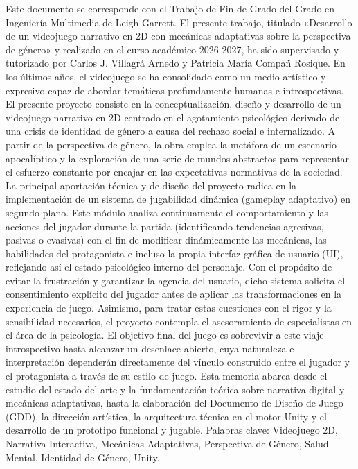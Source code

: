 
Este documento se corresponde con el Trabajo de Fin de Grado del Grado en Ingeniería Multimedia de Leigh Garrett. El presente trabajo, titulado «Desarrollo de un videojuego narrativo en 2D con mecánicas adaptativas sobre la perspectiva de género» y realizado en el curso académico 2026-2027, ha sido supervisado y tutorizado por Carlos J. Villagrá Arnedo y Patricia María Compañ Rosique.
En los últimos años, el videojuego se ha consolidado como un medio artístico y expresivo capaz de abordar temáticas profundamente humanas e introspectivas. El presente proyecto consiste en la conceptualización, diseño y desarrollo de un videojuego narrativo en 2D centrado en el agotamiento psicológico derivado de una crisis de identidad de género a causa del rechazo social e internalizado. A partir de la perspectiva de género, la obra emplea la metáfora de un escenario apocalíptico y la exploración de una serie de mundos abstractos para representar el esfuerzo constante por encajar en las expectativas normativas de la sociedad.
La principal aportación técnica y de diseño del proyecto radica en la implementación de un sistema de jugabilidad dinámica (gameplay adaptativo) en segundo plano. Este módulo analiza continuamente el comportamiento y las acciones del jugador durante la partida (identificando tendencias agresivas, pasivas o evasivas) con el fin de modificar dinámicamente las mecánicas, las habilidades del protagonista e incluso la propia interfaz gráfica de usuario (UI), reflejando así el estado psicológico interno del personaje. Con el propósito de evitar la frustración y garantizar la agencia del usuario, dicho sistema solicita el consentimiento explícito del jugador antes de aplicar las transformaciones en la experiencia de juego. Asimismo, para tratar estas cuestiones con el rigor y la sensibilidad necesarios, el proyecto contempla el asesoramiento de especialistas en el área de la psicología.
El objetivo final del juego es sobrevivir a este viaje introspectivo hasta alcanzar un desenlace abierto, cuya naturaleza e interpretación dependerán directamente del vínculo construido entre el jugador y el protagonista a través de su estilo de juego. Esta memoria abarca desde el estudio del estado del arte y la fundamentación teórica sobre narrativa digital y mecánicas adaptativas, hasta la elaboración del Documento de Diseño de Juego (GDD), la dirección artística, la arquitectura técnica en el motor Unity y el desarrollo de un prototipo funcional y jugable.
Palabras clave: Videojuego 2D, Narrativa Interactiva, Mecánicas Adaptativas, Perspectiva de Género, Salud Mental, Identidad de Género, Unity.
